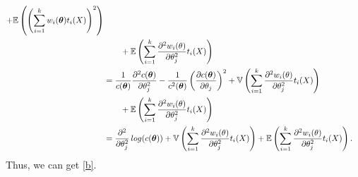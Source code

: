 \documentclass{article}
\begin{document}
\begin{CJK}{UTF8}{gbsn}
\begin{itemize}
\begin{align}
                  + \mathbb{E}\left (\left (\sum_{i=1}^kw_i(\boldsymbol{\theta})t_i(X) \right )^2\right )                                                                                                                         \notag                      \\
                    & \qquad + \mathbb{E}\left (\sum_{i=1}^k \frac{\partial^2 w_i(\boldmath\theta)}{\partial \theta_j^2} t_i(X) \right )                                                                                         \notag                       \\
                    & = \frac{1}{c(\boldsymbol{\theta})} \frac{\partial^2 c(\boldsymbol{\theta})}{\partial \theta_j^2}
                  - \frac{1}{c^2(\boldsymbol{\theta})} \left (\frac{\partial c(\boldsymbol{\theta})}{\partial \theta_j} \right )^2
                  + \mathbb{V}\left (\sum_{i=1}^k \frac{\partial^2 w_i(\boldmath\theta)}{\partial \theta_j^2} t_i(X) \right )                                                                                                          \notag                 \\
                    & \qquad + \mathbb{E}\left (\sum_{i=1}^k \frac{\partial^2 w_i(\boldmath\theta)}{\partial \theta_j^2} t_i(X) \right )                                                                                         \notag                       \\
                    & = \frac{\partial^2}{\partial \theta_j^2}\, log(c(\boldsymbol{\theta}))
                  + \mathbb{V}\left (\sum_{i=1}^k \frac{\partial^2 w_i(\boldmath\theta)}{\partial \theta_j^2} t_i(X) \right )
                  + \mathbb{E}\left (\sum_{i=1}^k \frac{\partial^2 w_i(\boldmath\theta)}{\partial \theta_j^2} t_i(X) \right ).\notag
              \end{align}
              Thus, we can get \eqref{b}.
    \end{itemize}



\end{CJK}
\end{document}
